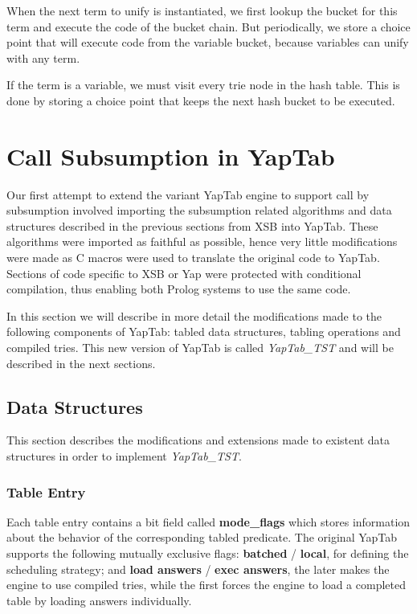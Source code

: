 When the next term to unify is instantiated, we first lookup the bucket for this
term and execute the code of the bucket chain. But periodically, we store a choice point that will
execute code from the variable bucket, because variables can unify with any term.

If the term is a variable, we must visit every trie node in the hash table. This is done
by storing a choice point that keeps the next hash bucket to be executed.

\section{Call Subsumption in YapTab}

Our first attempt to extend the variant YapTab engine to support call by subsumption
involved importing the subsumption related algorithms and data structures described in
the previous sections from XSB into YapTab. These algorithms were imported as faithful as possible,
hence very little modifications were made as C macros were used to translate the original
code to YapTab. Sections of code specific to XSB or Yap were protected with conditional
compilation, thus enabling both Prolog systems to use the same code.

In this section we will describe in more detail the modifications made to the following components of YapTab:
tabled data structures, tabling operations and compiled tries.
This new version of YapTab is called \textit{YapTab\_TST} and will be described in the next sections.

\subsection{Data Structures}

This section describes the modifications and extensions made to existent data structures
in order to implement \textit{YapTab\_TST}.

\subsubsection{Table Entry}

Each table entry contains a bit field called \textbf{mode\_flags} which stores information about
the behavior of the corresponding tabled predicate. The original YapTab supports the
following mutually exclusive flags: \textbf{batched} / \textbf{local}, for defining the scheduling strategy;
and \textbf{load answers} / \textbf{exec answers}, the later makes the engine to use compiled tries,
while the first forces the engine to load a completed table by loading answers individually.

